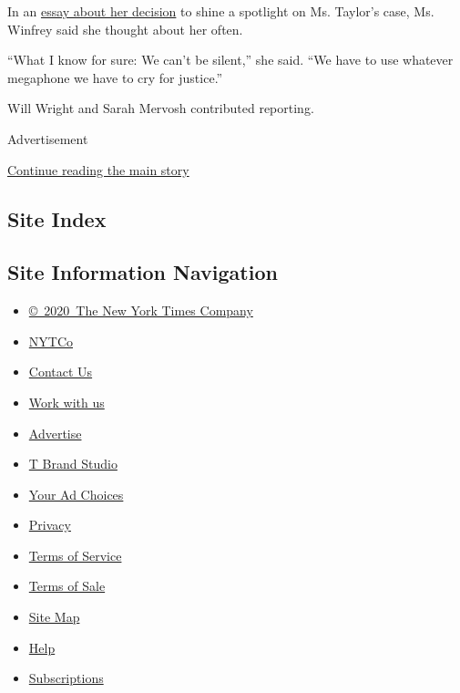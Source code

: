 In an
\href{https://www.oprahmag.com/life/a33449982/oprah-breonna-taylor/}{essay
about her decision} to shine a spotlight on Ms. Taylor's case, Ms.
Winfrey said she thought about her often.

``What I know for sure: We can't be silent,'' she said. ``We have to use
whatever megaphone we have to cry for justice.''

Will Wright and Sarah Mervosh contributed reporting.

Advertisement

\protect\hyperlink{after-bottom}{Continue reading the main story}

\hypertarget{site-index}{%
\subsection{Site Index}\label{site-index}}

\hypertarget{site-information-navigation}{%
\subsection{Site Information
Navigation}\label{site-information-navigation}}

\begin{itemize}
\tightlist
\item
  \href{https://help.nytimes3xbfgragh.onion/hc/en-us/articles/115014792127-Copyright-notice}{©~2020~The
  New York Times Company}
\end{itemize}

\begin{itemize}
\tightlist
\item
  \href{https://www.nytco.com/}{NYTCo}
\item
  \href{https://help.nytimes3xbfgragh.onion/hc/en-us/articles/115015385887-Contact-Us}{Contact
  Us}
\item
  \href{https://www.nytco.com/careers/}{Work with us}
\item
  \href{https://nytmediakit.com/}{Advertise}
\item
  \href{http://www.tbrandstudio.com/}{T Brand Studio}
\item
  \href{https://www.nytimes3xbfgragh.onion/privacy/cookie-policy\#how-do-i-manage-trackers}{Your
  Ad Choices}
\item
  \href{https://www.nytimes3xbfgragh.onion/privacy}{Privacy}
\item
  \href{https://help.nytimes3xbfgragh.onion/hc/en-us/articles/115014893428-Terms-of-service}{Terms
  of Service}
\item
  \href{https://help.nytimes3xbfgragh.onion/hc/en-us/articles/115014893968-Terms-of-sale}{Terms
  of Sale}
\item
  \href{https://spiderbites.nytimes3xbfgragh.onion}{Site Map}
\item
  \href{https://help.nytimes3xbfgragh.onion/hc/en-us}{Help}
\item
  \href{https://www.nytimes3xbfgragh.onion/subscription?campaignId=37WXW}{Subscriptions}
\end{itemize}
